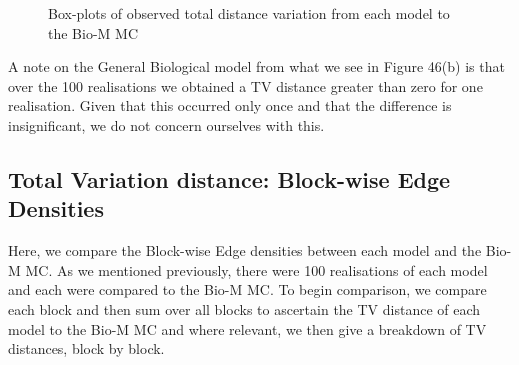 \begin{figure}[H]%
    \centering
    \captionsetup{justification=centering}
    \qquad
    \caption{Box-plots of observed total distance variation from each model to the Bio-M MC}%
    \label{fig:example}%
\end{figure}
A note on the General Biological model from what we see in Figure 46(b) is that over the 100 realisations we obtained a TV distance greater than zero for one realisation. Given that this occurred only once and that the difference is insignificant, we do not concern ourselves with this.

\subsection{Total Variation distance: Block-wise Edge Densities}
Here, we compare the Block-wise Edge densities between each model and the Bio-M MC. As we mentioned previously, there were 100 realisations of each model and each were compared to the Bio-M MC. To begin comparison, we compare each block and then sum over all blocks to ascertain the TV distance of each model to the Bio-M MC and where relevant, we then give a breakdown of TV distances, block by block.

